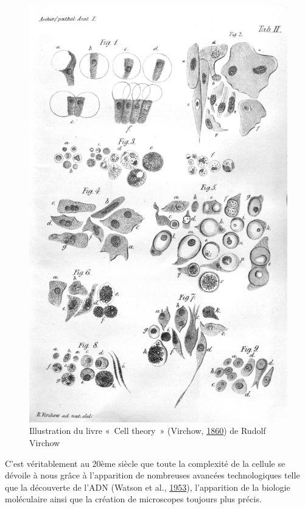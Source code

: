 \documentclass[12pt,a4paper,twoside,openright]{book}
\begin{document}
\begin{figure}[htbp]
\centering
\includegraphics{figures/intro/virchow.png}
\caption[Illustration du livre « Cell theory » de Rudolf Virchow]{\label{fig:virchow}Illustration
du livre «~Cell theory~» (Virchow,
\protect\hyperlink{ref-virchow1860cellular}{1860}) de Rudolf Virchow}
\end{figure}

C'est véritablement au 20ème siècle que toute la complexité de la
cellule se dévoile à nous grâce à l'apparition de nombreuses avancées
technologiques telle que la découverte de l'ADN (Watson et al.,
\protect\hyperlink{ref-watson1953molecular}{1953}), l'apparition de la
biologie moléculaire ainsi que la création de microscopes toujours plus
précis.
\end{document}

